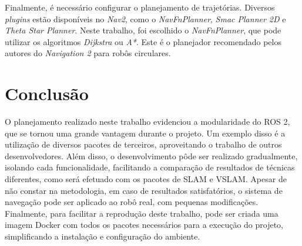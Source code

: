 \documentclass[repeatfields,xlists,xpacks,oneside,yearsonly]{ufrgscca}
\begin{document}
Finalmente, é necessário configurar o planejamento de trajetórias.
Diversos \textit{plugins}  estão disponíveis no \textit{Nav2},
como o \textit{NavFnPlanner}, \textit{Smac Planner 2D} e \textit{Theta Star Planner}.
Neste trabalho, foi escolhido o \textit{NavFnPlanner}, que pode utilizar
os algoritmos \textit{Dijkstra} ou \textit{A*}. %
Este é o planejador recomendado pelos autores do \textit{Navigation 2}
para robôs circulares.

\chapter{Conclusão}
\label{conclusao}

O planejamento realizado neste trabalho evidenciou a modularidade do ROS 2,
que se tornou uma grande vantagem durante o projeto.
Um exemplo disso é a utilização de diversos pacotes de terceiros,
aproveitando o trabalho de outros desenvolvedores.
Além disso, o desenvolvimento pôde ser realizado gradualmente,
isolando cada funcionalidade, facilitando a comparação
de resultados de técnicas diferentes, como será efetuado com os pacotes de SLAM
e VSLAM.
Apesar de não constar na metodologia, em caso de resultados satisfatórios,
o sistema de navegação pode ser aplicado ao robô real, com pequenas
modificações.
Finalmente, para facilitar a reprodução deste trabalho, pode ser
criada uma imagem Docker com todos os pacotes necessários para a execução do
projeto, simplificando a instalação e configuração do ambiente.


\printbibliography

%
%
%
\end{document}
